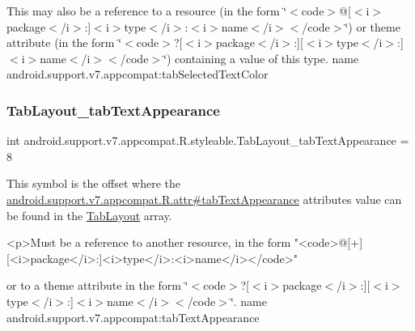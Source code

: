 This may also be a reference to a resource (in the form \char`\"{}$<$code$>$@\mbox{[}$<$i$>$package$<$/i$>$\+:\mbox{]}$<$i$>$type$<$/i$>$\+:$<$i$>$name$<$/i$>$$<$/code$>$\char`\"{}) or theme attribute (in the form \char`\"{}$<$code$>$?\mbox{[}$<$i$>$package$<$/i$>$\+:\mbox{]}\mbox{[}$<$i$>$type$<$/i$>$\+:\mbox{]}$<$i$>$name$<$/i$>$$<$/code$>$\char`\"{}) containing a value of this type.  name android.\+support.\+v7.\+appcompat\+:tab\+Selected\+Text\+Color \mbox{\label{classandroid_1_1support_1_1v7_1_1appcompat_1_1R_1_1styleable_a7ee7e0ba38afd5264e1ff4cd29c5d183}} 
\subsubsection{\texorpdfstring{Tab\+Layout\+\_\+tab\+Text\+Appearance}{TabLayout\_tabTextAppearance}}
{\footnotesize\ttfamily int android.\+support.\+v7.\+appcompat.\+R.\+styleable.\+Tab\+Layout\+\_\+tab\+Text\+Appearance = 8\hspace{0.3cm}{\ttfamily [static]}}

This symbol is the offset where the \hyperlink{classandroid_1_1support_1_1v7_1_1appcompat_1_1R_1_1attr_ade27c2db1b2e6562fc6b3db5270492de}{android.\+support.\+v7.\+appcompat.\+R.\+attr\#tab\+Text\+Appearance} attribute\textquotesingle{}s value can be found in the \hyperlink{classandroid_1_1support_1_1v7_1_1appcompat_1_1R_1_1styleable_a3c85d0c4cebbccf5b1a16ecfe13938ca}{Tab\+Layout} array.

\begin{DoxyVerb}      <p>Must be a reference to another resource, in the form "<code>@[+][<i>package</i>:]<i>type</i>:<i>name</i></code>"
\end{DoxyVerb}
 or to a theme attribute in the form \char`\"{}$<$code$>$?\mbox{[}$<$i$>$package$<$/i$>$\+:\mbox{]}\mbox{[}$<$i$>$type$<$/i$>$\+:\mbox{]}$<$i$>$name$<$/i$>$$<$/code$>$\char`\"{}.  name android.\+support.\+v7.\+appcompat\+:tab\+Text\+Appearance \mbox{\label{classandroid_1_1support_1_1v7_1_1appcompat_1_1R_1_1styleable_abad9974ac19ca4794058c4665a9bd530}} 
